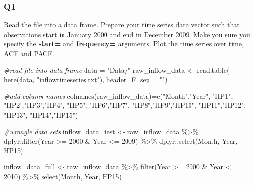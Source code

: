 \documentclass[
]{article}
\newenvironment{Shaded}{\begin{snugshade}}{\end{snugshade}}
\newcommand{\AttributeTok}[1]{\textcolor[rgb]{0.77,0.63,0.00}{#1}}
\newcommand{\CommentTok}[1]{\textcolor[rgb]{0.56,0.35,0.01}{\textit{#1}}}
\newcommand{\DecValTok}[1]{\textcolor[rgb]{0.00,0.00,0.81}{#1}}
\newcommand{\FunctionTok}[1]{\textcolor[rgb]{0.00,0.00,0.00}{#1}}
\newcommand{\NormalTok}[1]{#1}
\newcommand{\OtherTok}[1]{\textcolor[rgb]{0.56,0.35,0.01}{#1}}
\newcommand{\SpecialCharTok}[1]{\textcolor[rgb]{0.00,0.00,0.00}{#1}}
\newcommand{\StringTok}[1]{\textcolor[rgb]{0.31,0.60,0.02}{#1}}
\begin{document}
\hypertarget{q1}{%
\subsubsection{Q1}\label{q1}}

Read the file into a data frame. Prepare your time series data vector
such that observations start in January 2000 and end in December 2009.
Make you sure you specify the \textbf{start=} and \textbf{frequency=}
arguments. Plot the time series over time, ACF and PACF.

\begin{Shaded}
\begin{Highlighting}[]
\CommentTok{\#read file into data frame}
\NormalTok{data }\OtherTok{=} \StringTok{"Data/"}
\NormalTok{raw\_inflow\_data }\OtherTok{\textless{}{-}} \FunctionTok{read.table}\NormalTok{(}
  \FunctionTok{here}\NormalTok{(data, }\StringTok{"inflowtimeseries.txt"}\NormalTok{), }\AttributeTok{header=}\NormalTok{F, }\AttributeTok{sep =} \StringTok{""}\NormalTok{) }

\CommentTok{\#add column names}
\FunctionTok{colnames}\NormalTok{(raw\_inflow\_data)}\OtherTok{=}\FunctionTok{c}\NormalTok{(}\StringTok{"Month"}\NormalTok{,}\StringTok{"Year"}\NormalTok{, }\StringTok{"HP1"}\NormalTok{, }\StringTok{"HP2"}\NormalTok{,}\StringTok{"HP3"}\NormalTok{,}\StringTok{"HP4"}\NormalTok{, }\StringTok{"HP5"}\NormalTok{,}
                            \StringTok{"HP6"}\NormalTok{,}\StringTok{"HP7"}\NormalTok{, }\StringTok{"HP8"}\NormalTok{,}\StringTok{"HP9"}\NormalTok{,}\StringTok{"HP10"}\NormalTok{, }\StringTok{"HP11"}\NormalTok{,}\StringTok{"HP12"}\NormalTok{, }
                            \StringTok{"HP13"}\NormalTok{, }\StringTok{"HP14"}\NormalTok{,}\StringTok{"HP15"}\NormalTok{)}


\CommentTok{\#wrangle data sets}
\NormalTok{inflow\_data\_test }\OtherTok{\textless{}{-}}
\NormalTok{  raw\_inflow\_data }\SpecialCharTok{\%\textgreater{}\%}
\NormalTok{  dplyr}\SpecialCharTok{::}\FunctionTok{filter}\NormalTok{(Year }\SpecialCharTok{\textgreater{}=} \DecValTok{2000} \SpecialCharTok{\&}\NormalTok{ Year }\SpecialCharTok{\textless{}=} \DecValTok{2009}\NormalTok{) }\SpecialCharTok{\%\textgreater{}\%}
\NormalTok{  dplyr}\SpecialCharTok{::}\FunctionTok{select}\NormalTok{(Month, Year, HP15)}

\NormalTok{inflow\_data\_full }\OtherTok{\textless{}{-}} 
\NormalTok{  raw\_inflow\_data }\SpecialCharTok{\%\textgreater{}\%}
  \FunctionTok{filter}\NormalTok{(Year }\SpecialCharTok{\textgreater{}=} \DecValTok{2000} \SpecialCharTok{\&}\NormalTok{ Year }\SpecialCharTok{\textless{}=} \DecValTok{2010}\NormalTok{) }\SpecialCharTok{\%\textgreater{}\%}
  \FunctionTok{select}\NormalTok{(Month, Year, HP15)}




\end{Highlighting}
\end{Shaded}
\end{document}

